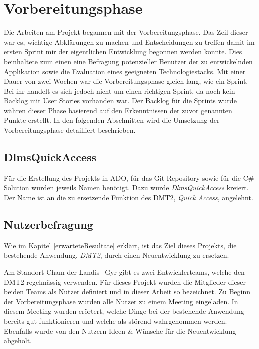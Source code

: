 \section{Vorbereitungsphase}
Die Arbeiten am Projekt begannen mit der Vorbereitungsphase. Das Zeil dieser war es, wichtige Abklärungen zu machen und Entscheidungen zu treffen damit im ersten Sprint mir der eigentlichen Entwicklung begonnen werden konnte.
Dies beinhaltete zum einen eine Befragung potenzieller Benutzer der zu entwickelnden Applikation sowie die Evaluation eines geeigneten Technologiestacks.
Mit einer Dauer von zwei Wochen war die Vorbereitungsphase gleich lang, wie ein Sprint. Bei ihr handelt es sich jedoch nicht um einen richtigen Sprint, da noch kein Backlog mit User Stories vorhanden war.
Der Backlog für die Sprints wurde währen dieser Phase basierend auf den Erkenntnissen der zuvor genannten Punkte erstellt.
In den folgenden Abschnitten wird die Umsetzung der Vorbereitungsphase detailliert beschrieben.

\subsection{DlmsQuickAccess}
Für die Erstellung des Projekts in \ac{ADO}, für das Git-Repository sowie für die C\# Solution wurden jeweils Namen benötigt.
Dazu wurde \textit{DlmsQuickAccess} kreiert.
Der Name ist an die zu ersetzende Funktion des \ac{DMT2}, \textit{Quick Access}, angelehnt.

\subsection{Nutzerbefragung}\label{survey}
Wie im Kapitel \ref{erwarteteResultate} erklärt, ist das Ziel dieses Projekts, die bestehende Anwendung, \textit{DMT2}, durch einen Neuentwicklung zu ersetzen.

Am Standort Cham der Landis+Gyr gibt es zwei Entwicklerteams, welche den DMT2 regelmässig verwenden.
Für dieses Projekt wurden die Mitglieder dieser beiden Teams als Nutzer definiert und in dieser Arbeit so bezeichnet.  %
Zu Beginn der Vorbereitungsphase wurden alle Nutzer zu einem Meeting eingeladen.
In diesem Meeting wurden erörtert, welche Dinge bei der bestehende Anwendung bereits gut funktionieren und welche als störend wahrgenommen werden.
Ebenfalls wurde von den Nutzern Ideen \& Wünsche für die Neuentwicklung abgeholt.

